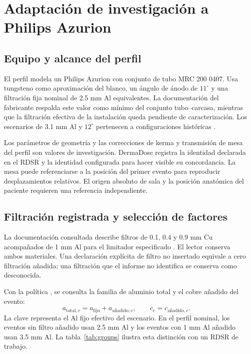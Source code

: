 \chapter{Adaptación de investigación a Philips Azurion}

\section{Equipo y alcance del perfil}
El perfil  modela un Philips Azurion con conjunto de tubo MRC 200 0407. Usa tungsteno como aproximación del blanco, un ángulo de ánodo de $11^\circ$ y una filtración fija nominal de \num{2.5} mm Al equivalentes. La documentación del fabricante respalda este valor como mínimo del conjunto tubo--carcasa, mientras que la filtración efectiva de la instalación queda pendiente de caracterización. Los escenarios de \num{3.1} mm Al y $12^\circ$ pertenecen a configuraciones históricas \citep{philipsifu,clarity}.

Los parámetros de geometría y las correcciones de kerma y transmisión de mesa del perfil son valores de investigación. DermaDose registra la identidad declarada en el RDSR y la identidad configurada para hacer visible su concordancia. La mesa puede referenciarse a la posición del primer evento para reproducir desplazamientos relativos. El origen absoluto de sala y la posición anatómica del paciente requieren una referencia independiente.

\section{Filtración registrada y selección de factores}
La documentación consultada describe filtros de \num{0.1}, \num{0.4} y \num{0.9} mm Cu acompañados de 1 mm Al para el limitador especificado \citep{philipsifu,clarity}. El lector conserva ambos materiales. Una declaración explícita de filtro no insertado equivale a cero filtración añadida; una filtración que el informe no identifica se conserva como desconocida.

Con la política , se consulta la familia de aluminio total y el cobre añadido del evento:
\begin{equation}\label{eq:al}
a_{\mathrm{total},e}=a_{\mathrm{fijo}}+a_{\text{añadido},e},\qquad
c_e=c_{\text{añadido},e}.
\end{equation}
La clave  representa el Al fijo efectivo del escenario. En el perfil nominal, los eventos sin filtro añadido usan \num{2.5} mm Al y los eventos con 1 mm Al añadido usan \num{3.5} mm Al. La tabla~\ref{tab:groups} ilustra esta distinción con un RDSR de trabajo.

